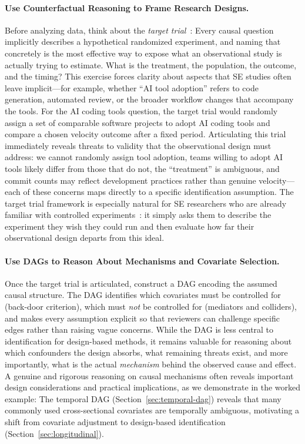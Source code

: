 \paragraph{Use Counterfactual Reasoning to Frame Research Designs.}
\label{sec:guide-question}
Before analyzing data, think about the \emph{target trial}~\cite{hernan2020causal}: Every causal question implicitly describes a hypothetical randomized experiment, and naming that concretely is the most effective way to expose what an observational study is actually trying to estimate.
What is the treatment, the population, the outcome, and the timing?
This exercise forces clarity about aspects that SE studies often leave implicit---for example, whether ``AI tool adoption'' refers to code generation, automated review, or the broader workflow changes that accompany the tools.
For the AI coding tools question, the target trial would randomly assign a set of comparable software projects to adopt AI coding tools and compare a chosen velocity outcome after a fixed period.
Articulating this trial immediately reveals threats to validity that the observational design must address: we cannot randomly assign tool adoption, teams willing to adopt AI tools likely differ from those that do not, the ``treatment'' is ambiguous, and commit counts may reflect development practices rather than genuine velocity---each of these concerns maps directly to a specific identification assumption.
The target trial framework is especially natural for SE researchers who are already familiar with controlled experiments~\cite{DBLP:books/sp/WohlinRHORW24}: it simply asks them to describe the experiment they wish they could run and then evaluate how far their observational design departs from this ideal.

\paragraph{Use DAGs to Reason About Mechanisms and Covariate Selection.}
\label{sec:guide-path-a}
Once the target trial is articulated, construct a DAG encoding the assumed causal structure.
The DAG identifies which covariates must be controlled for (back-door criterion), which must \emph{not} be controlled for (mediators and colliders), and makes every assumption explicit so that reviewers can challenge specific edges rather than raising vague concerns.
While the DAG is less central to identification for design-based methods, it remains valuable for reasoning about which confounders the design absorbs, what remaining threats exist, and more importantly, what is the actual \emph{mechanism} behind the observed cause and effect.
A genuine and rigorous reasoning on causal mechanisms often reveals important design considerations and practical implications, as we demonstrate in the worked example: The temporal DAG (Section~\ref{sec:temporal-dag}) reveals that many commonly used cross-sectional covariates are temporally ambiguous, motivating a shift from covariate adjustment to design-based identification (Section~\ref{sec:longitudinal}).

